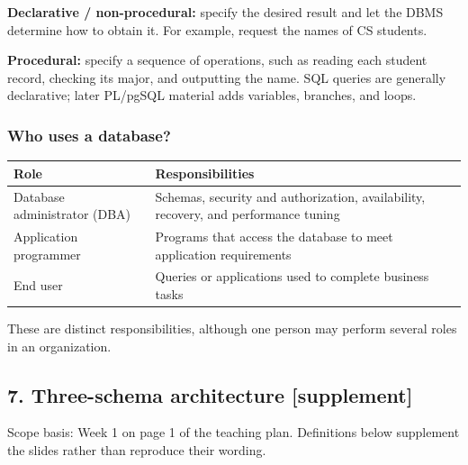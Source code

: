 \textbf{Declarative / non-procedural:} specify the desired result and let the DBMS determine how to obtain it. For example, request the names of CS students.

\textbf{Procedural:} specify a sequence of operations, such as reading each student record, checking its major, and outputting the name. SQL queries are generally declarative; later PL/pgSQL material adds variables, branches, and loops.

\subsubsection{Who uses a database?}\label{01_database_fundamentals_en-who-uses-a-database}

\begin{longtable}[]{@{}
  >{\raggedright\arraybackslash}p{}
  >{\raggedright\arraybackslash}p{}@{}}
\toprule\noalign{}
\begin{minipage}[b]{\linewidth}\raggedright
Role
\end{minipage} & \begin{minipage}[b]{\linewidth}\raggedright
Responsibilities
\end{minipage} \\
\midrule\noalign{}
\endhead
\bottomrule\noalign{}
\endlastfoot
Database administrator (DBA) & Schemas, security and authorization, availability, recovery, and performance tuning \\
Application programmer & Programs that access the database to meet application requirements \\
End user & Queries or applications used to complete business tasks \\
\end{longtable}

These are distinct responsibilities, although one person may perform several roles in an organization.

\Needspace{11cm}
\subsection{7. Three-schema architecture {[}supplement{]}}\label{01_database_fundamentals_en-three-schema-architecture-supplement}


Scope basis: Week 1 on page 1 of the teaching plan. Definitions below supplement the slides rather than reproduce their wording.

